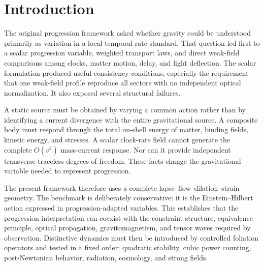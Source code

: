 \documentclass[11pt]{article}
\begin{document}
\section{Introduction}

The original progression framework asked whether gravity could be understood primarily as variation in a local temporal rate standard.  That question led first to a scalar progression variable, weighted transport laws, and direct weak-field comparisons among clocks, matter motion, delay, and light deflection.  The scalar formulation produced useful consistency conditions, especially the requirement that one weak-field profile reproduce all sectors with no independent optical normalization.  It also exposed several structural failures.

A static source must be obtained by varying a common action rather than by identifying a current divergence with the entire gravitational source.  A composite body must respond through the total on-shell energy of matter, binding fields, kinetic energy, and stresses.  A scalar clock-rate field cannot generate the complete $O(v^3)$ mass-current response.  Nor can it provide independent transverse-traceless degrees of freedom.  These facts change the gravitational variable needed to represent progression.

The present framework therefore uses a complete lapse--flow--dilation--strain geometry.  The benchmark is deliberately conservative: it is the Einstein--Hilbert action expressed in progression-adapted variables.  This establishes that the progression interpretation can coexist with the constraint structure, equivalence principle, optical propagation, gravitomagnetism, and tensor waves required by observation.  Distinctive dynamics must then be introduced by controlled foliation operators and tested in a fixed order: quadratic stability, cubic power counting, post-Newtonian behavior, radiation, cosmology, and strong fields.
\end{document}
